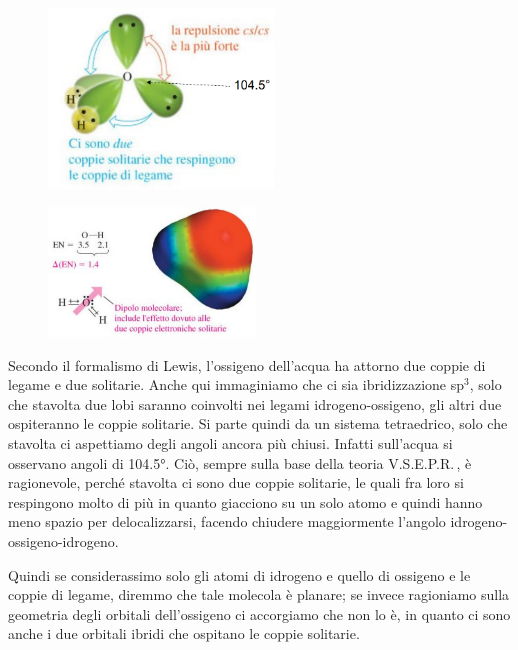 \hspace{2cm}\begin{minipage}{0.4\textwidth}
    \begin{figure}[H]
        \includegraphics[width=6cm]{immagini/acqua.png}
    \end{figure}
\end{minipage}
\begin{minipage}{0.3\textwidth}
    \begin{figure}[H]
        \includegraphics[width=5.5cm]{immagini/dipolo-acqua.png}
    \end{figure}
\end{minipage}

\vspace{0.2cm}Secondo il formalismo di Lewis, l'ossigeno dell'acqua ha attorno due coppie di legame e due solitarie. Anche qui immaginiamo che ci sia ibridizzazione sp$^3$, solo che stavolta due lobi saranno coinvolti nei legami idrogeno-ossigeno, gli altri due ospiteranno le coppie solitarie. Si parte quindi da un sistema tetraedrico, solo che stavolta ci aspettiamo degli angoli ancora più chiusi. Infatti sull'acqua si osservano angoli di 104.5°. Ciò, sempre sulla base della teoria V.S.E.P.R.\,, è ragionevole, perché stavolta ci sono due coppie solitarie, le quali fra loro si respingono molto di più in quanto giacciono su un solo atomo e quindi hanno meno spazio per delocalizzarsi, facendo chiudere maggiormente l'angolo idrogeno-ossigeno-idrogeno.

Quindi se considerassimo solo gli atomi di idrogeno e quello di ossigeno e le coppie di legame, diremmo che tale molecola è planare; se invece ragioniamo sulla geometria degli orbitali dell'ossigeno ci accorgiamo che non lo è, in quanto ci sono anche i due orbitali ibridi che ospitano le coppie solitarie.

